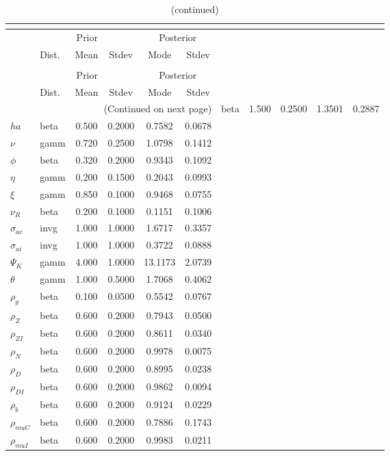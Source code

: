  
\begin{center}
\begin{longtable}{llcccc} 
\caption{Results from posterior maximization (parameters)}\\
 \label{Table:Posterior:1}\\
\toprule 
  & \multicolumn{3}{c}{Prior}  &  \multicolumn{2}{c}{Posterior} \\
  \cmidrule(r{.75em}){2-4} \cmidrule(r{.75em}){5-6}
  & Dist. & Mean  & Stdev & Mode & Stdev \\ 
\midrule \endfirsthead 
\caption{(continued)}\\
 \bottomrule 
  & \multicolumn{3}{c}{Prior}  &  \multicolumn{2}{c}{Posterior} \\
  \cmidrule(r{.75em}){2-4} \cmidrule(r{.75em}){5-6}
  & Dist. & Mean  & Stdev & Mode & Stdev \\ 
\midrule \endhead 
\bottomrule \multicolumn{6}{r}{(Continued on next page)}\endfoot 
\bottomrule\endlastfoot 
${\sigma}$ & beta &   1.500 & 0.2500 &   1.3501 &  0.2887 \\ 
${ha}$ & beta &   0.500 & 0.2000 &   0.7582 &  0.0678 \\ 
$\nu$ & gamm &   0.720 & 0.2500 &   1.0798 &  0.1412 \\ 
${\phi}$ & beta &   0.320 & 0.2000 &   0.9343 &  0.1092 \\ 
${\eta}$ & gamm &   0.200 & 0.1500 &   0.2043 &  0.0993 \\ 
$\xi$ & gamm &   0.850 & 0.1000 &   0.9468 &  0.0755 \\ 
${\nu_R}$ & beta &   0.200 & 0.1000 &   0.1151 &  0.1006 \\ 
${\sigma_{ac}}$ & invg &   1.000 & 1.0000 &   1.6717 &  0.3357 \\ 
${\sigma_{ai}}$ & invg &   1.000 & 1.0000 &   0.3722 &  0.0888 \\ 
${\Psi_{K}}$ & gamm &   4.000 & 1.0000 &  13.1173 &  2.0739 \\ 
${\theta}$ & gamm &   1.000 & 0.5000 &   1.7068 &  0.4062 \\ 
${\rho_g}$ & beta &   0.100 & 0.0500 &   0.5542 &  0.0767 \\ 
${\rho_Z}$ & beta &   0.600 & 0.2000 &   0.7943 &  0.0500 \\ 
${\rho_{ZI}}$ & beta &   0.600 & 0.2000 &   0.8611 &  0.0340 \\ 
${\rho_N}$ & beta &   0.600 & 0.2000 &   0.9978 &  0.0075 \\ 
${\rho_D}$ & beta &   0.600 & 0.2000 &   0.8995 &  0.0238 \\ 
${\rho_{DI}}$ & beta &   0.600 & 0.2000 &   0.9862 &  0.0094 \\ 
${\rho_b}$ & beta &   0.600 & 0.2000 &   0.9124 &  0.0229 \\ 
${\rho_{muC}}$ & beta &   0.600 & 0.2000 &   0.7886 &  0.1743 \\ 
${\rho_{muI}}$ & beta &   0.600 & 0.2000 &   0.9983 &  0.0211 \\ 
\end{longtable}
 \end{center}
